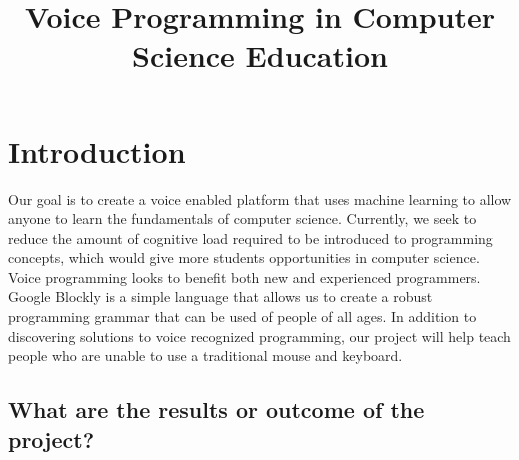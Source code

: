 \documentclass[]{article}
\title{Voice Programming in Computer Science Education}
\begin{document}
\maketitle

\section{Introduction}


Our goal is to create a voice enabled platform that uses machine learning to allow 
anyone to learn the fundamentals of computer science. Currently, we seek to reduce the amount
of cognitive load required to be introduced to programming concepts, which would give more 
students opportunities in computer science. 
\\ 
Voice programming looks to benefit both new and experienced programmers.  
Google Blockly is a simple language that allows us to create a robust programming grammar 
that can be used of people of all ages. In addition to discovering solutions to voice 
recognized programming, our project will help teach people who are unable to use a traditional mouse and keyboard.

\subsection{What are the results or outcome of the project?}
\end{document}
